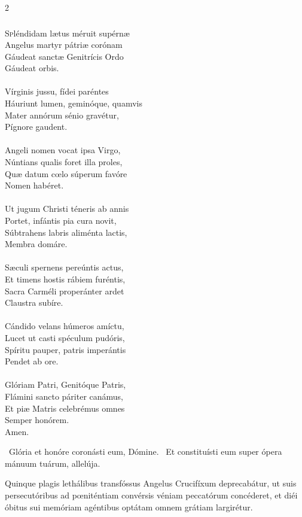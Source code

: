 \documentclass[9pt,twoside]{extarticle}
\begin{document}
\begin{multicols}{2}
\subsubsection*{\center {}}
\lettrine{S}pléndidam lætus méruit supérnæ\\
Angelus martyr pátriæ corónam\\
Gáudeat sanctæ Genitrícis Ordo\\
Gáudeat orbis.\\
\\
Vírginis jussu, fídei paréntes\\
Háuriunt lumen, geminóque, quamvis\\
Mater annórum sénio gravétur,\\
Pígnore gaudent.\\
\\
Angeli nomen vocat ipsa Virgo,\\
Núntians qualis foret illa proles,\\
Quæ datum cœlo súperum favóre\\
Nomen habéret.\\
\\
Ut jugum Christi téneris ab annis\\
Portet, infántis pia cura novit,\\
Súbtrahens labris aliménta lactis,\\
Membra domáre.\\
\\
Sæculi spernens pereúntis actus,\\
Et timens hostis rábiem furéntis,\\
Sacra Carméli properánter ardet\\
Claustra subíre.\\
\\
Cándido velans húmeros amíctu,\\
Lucet ut casti spéculum pudóris,\\
Spíritu pauper, patris imperántis\\
Pendet ab ore.\\
\\
Glóriam Patri, Genitóque Patris,\\
Flámini sancto páriter canámus,\\
Et piæ Matris celebrémus omnes\\
Semper honórem.\\
Amen.

\begin{tightlist}{}
\item {}~Glória et honóre coronásti eum, Dómine. ~Et constituísti eum super ópera mánuum tuárum, allelúja.
\item {} Quinque plagis lethálibus transfóssus Angelus Crucifíxum deprecabátur, ut suis persecutóribus ad pœniténtiam convérsis véniam peccatórum concéderet, et diéi óbitus sui memóriam agéntibus optátam omnem grátiam largirétur.
\end{tightlist}


\end{multicols}
\end{document}
